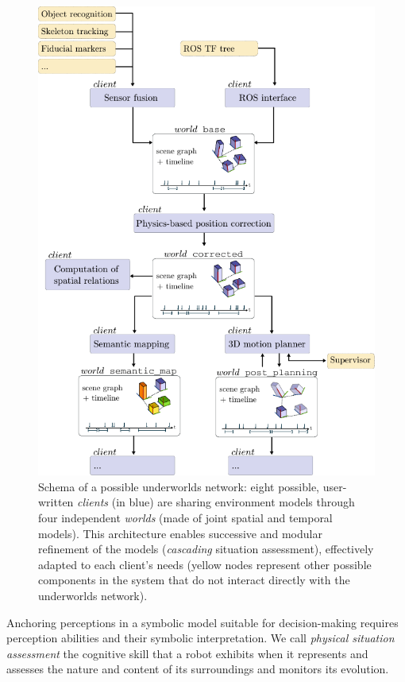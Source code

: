 \documentclass[letterpaper, 10 pt, conference]{ieeeconf}  %
\newcommand{\uwds}{{\sc underworlds}\xspace}
\begin{document}
\begin{figure}[ht!]
    \centering
    \includegraphics[width=\linewidth]{overview}
    \caption{Schema of a possible \uwds network: eight possible, user-written
    \emph{clients} (in blue) are sharing environment models through four
    independent \emph{worlds} (made of joint spatial and temporal models). This architecture
    enables successive and modular refinement of the models
    (\emph{cascading} situation assessment), effectively adapted to each
    client's needs (yellow nodes represent other possible components in the system that do not
    interact directly with the \uwds network).}

    \label{fig|scene}

\end{figure}


Anchoring perceptions in a symbolic model suitable for decision-making requires
perception abilities and their symbolic interpretation. We call \emph{physical
situation assessment} the cognitive skill that a robot exhibits when it
represents and assesses the nature and content of its surroundings and monitors
its evolution.
\end{document}
